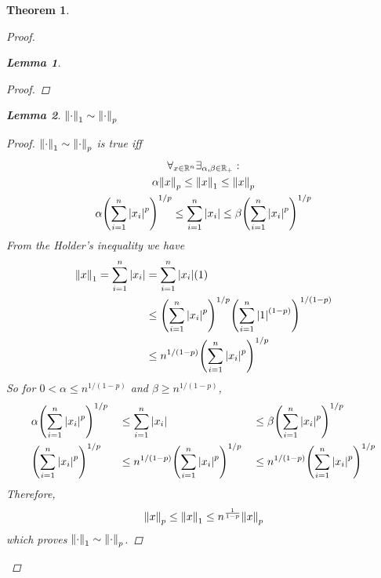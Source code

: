 \documentclass[]{article}
\newcommand{\R}{\mathbb{R}}
\newtheorem{theorem}{Theorem}
\newtheorem{lemma}{Lemma}
\begin{document}
\begin{theorem}
\begin{proof}
\begin{lemma}
\begin{proof}
            \end{proof}
        \end{lemma}
        \newpage
        \begin{lemma}\label{lem:1toP}
            $\norm{\cdot}_1 \sim \norm{\cdot}_p$
            \begin{proof}
                $\norm{\cdot}_1 \sim \norm{\cdot}_p$ is true iff
                \begin{multline*}
                    \forall_{x \in \R^n} \exists_{\alpha,\beta \in \R_+} :\\
                    \alpha \norm{x}_p 
                        \leq \norm{x}_1 
                        \leq \norm{x}_p\\
                    \alpha \qty(\sum_{i=1}^n \abs{x_i}^p)^{1/p}
                        \leq \sum_{i=1}^n \abs{x_i}
                        \leq \beta \qty(\sum_{i=1}^n \abs{x_i}^p)^{1/p}\\
                \end{multline*}
                From the Holder's inequality we have 
                \begin{align*}
                    \norm{x}_1 = \sum_{i=1}^n \abs{x_i}
                        &= \sum_{i=1}^n \abs{x_i} (1)\\
                        &\leq \qty(\sum_{i=1}^n \abs{x_i}^p)^{1/p}
                            \qty(\sum_{i=1}^n \abs{1}^{(1-p)})^{1/(1-p)}\\
                        &\leq n^{1/(1-p)} \qty(\sum_{i=1}^n \abs{x_i}^p)^{1/p} 
                \end{align*}
                So for $0 < \alpha \leq n^{1/(1-p)}$ and $\beta \geq n^{1/(1-p)}$,
                \begin{align*}
                    &\alpha \qty(\sum_{i=1}^n \abs{x_i}^p)^{1/p}
                        &&\leq \sum_{i=1}^n \abs{x_i}
                        &&\leq \beta \qty(\sum_{i=1}^n \abs{x_i}^p)^{1/p}\\
                    &\qty(\sum_{i=1}^n \abs{x_i}^p)^{1/p}
                        &&\leq n^{1/(1-p)} \qty(\sum_{i=1}^n \abs{x_i}^p)^{1/p} 
                        &&\leq n^{1/(1-p)} \qty(\sum_{i=1}^n \abs{x_i}^p)^{1/p}
                \end{align*}
                Therefore,
                \[\norm{x}_p \leq \norm{x}_1 \leq n^{\frac{1}{1-p}} \norm{x}_p\]
                which proves $\norm{\cdot}_1 \sim \norm{\cdot}_p$.
            \end{proof}

\end{lemma}
\end{proof}
\end{theorem}
\end{document}
